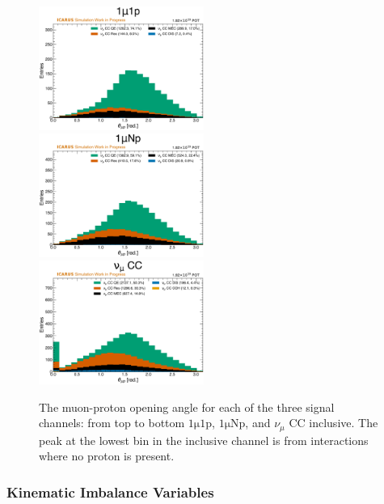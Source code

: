 \begin{figure}[!htb]
    \centering
    \includegraphics[width=0.48\textwidth]{figures/neutrino_selection/signal_hist1d_1mu1p_opening_angle.pdf}\\
    \includegraphics[width=0.48\textwidth]{figures/neutrino_selection/signal_hist1d_1muNp_opening_angle.pdf}\\
    \includegraphics[width=0.48\textwidth]{figures/neutrino_selection/signal_hist1d_1muX_opening_angle.pdf}\\
    \caption{The muon-proton opening angle for each of the three signal channels: from top to bottom $\mathrm{1\mu 1p}$, $\mathrm{1\mu Np}$, and $\nu_\mu$ CC inclusive. The peak at the lowest bin in the inclusive channel is from interactions where no proton is present.}
    \label{fig:opening_angle}
\end{figure}

\subsubsection{Kinematic Imbalance Variables}
\label{sec:kinematic_imbalance_variables}

